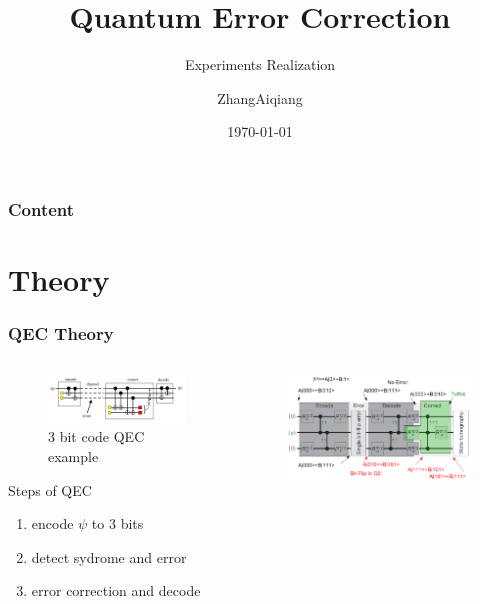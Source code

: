 \documentclass[aspectratio=169,10pt]{beamer}
\title{Quantum Error Correction}
\subtitle{Experiments Realization}
\author{ZhangAiqiang}
\institute{Tsinghua University}
\date{\today}
\begin{document}
\begin{frame}
    \titlepage
\end{frame}
\begin{frame}
    \frametitle{Content}
    \tableofcontents
\end{frame}
\section{Theory}
\begin{frame}
    \frametitle{QEC Theory}
    \begin{columns}
        \begin{column}{0.5\textwidth}
            \begin{figure}
                \includegraphics[width=\columnwidth]{figure/3bit.png}
                \caption{3 bit code QEC example}
            \end{figure}
            \begin{block}{Steps of QEC}
                \begin{enumerate}
                    \item encode $\psi$ to 3 bits
                    \item detect sydrome and error
                    \item error correction and decode
                \end{enumerate}
            \end{block}
        \end{column}
        \begin{column}{0.5\textwidth}
        \begin{figure}
            \includegraphics[width=0.9\columnwidth]{figure/toffoli.png}

\end{figure}
\end{column}
\end{columns}
\end{frame}
\end{document}
